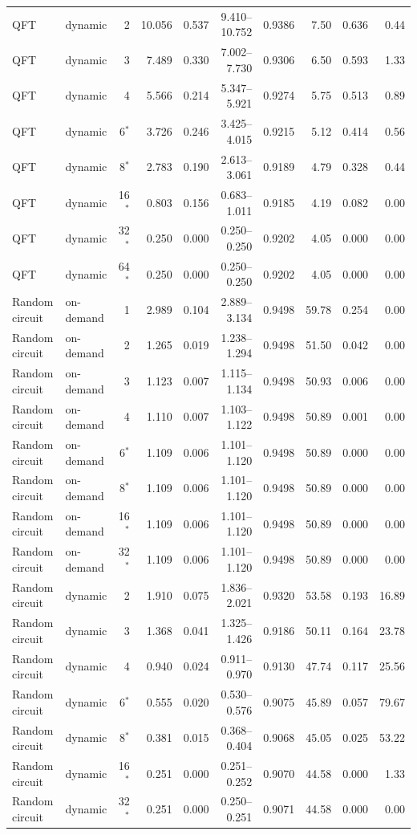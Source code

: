 {\begin{longtable}{@{}llrrrrrrrr@{}}
QFT & dynamic & 2 & 10.056 & 0.537 & 9.410--10.752 & 0.9386 & 7.50 & 0.636 & 0.44 \\
QFT & dynamic & 3 & 7.489 & 0.330 & 7.002--7.730 & 0.9306 & 6.50 & 0.593 & 1.33 \\
QFT & dynamic & 4 & 5.566 & 0.214 & 5.347--5.921 & 0.9274 & 5.75 & 0.513 & 0.89 \\
QFT & dynamic & 6$^*$ & 3.726 & 0.246 & 3.425--4.015 & 0.9215 & 5.12 & 0.414 & 0.56 \\
QFT & dynamic & 8$^*$ & 2.783 & 0.190 & 2.613--3.061 & 0.9189 & 4.79 & 0.328 & 0.44 \\
QFT & dynamic & 16$^*$ & 0.803 & 0.156 & 0.683--1.011 & 0.9185 & 4.19 & 0.082 & 0.00 \\
QFT & dynamic & 32$^*$ & 0.250 & 0.000 & 0.250--0.250 & 0.9202 & 4.05 & 0.000 & 0.00 \\
QFT & dynamic & 64$^*$ & 0.250 & 0.000 & 0.250--0.250 & 0.9202 & 4.05 & 0.000 & 0.00 \\
Random circuit & on-demand & 1 & 2.989 & 0.104 & 2.889--3.134 & 0.9498 & 59.78 & 0.254 & 0.00 \\
Random circuit & on-demand & 2 & 1.265 & 0.019 & 1.238--1.294 & 0.9498 & 51.50 & 0.042 & 0.00 \\
Random circuit & on-demand & 3 & 1.123 & 0.007 & 1.115--1.134 & 0.9498 & 50.93 & 0.006 & 0.00 \\
Random circuit & on-demand & 4 & 1.110 & 0.007 & 1.103--1.122 & 0.9498 & 50.89 & 0.001 & 0.00 \\
Random circuit & on-demand & 6$^*$ & 1.109 & 0.006 & 1.101--1.120 & 0.9498 & 50.89 & 0.000 & 0.00 \\
Random circuit & on-demand & 8$^*$ & 1.109 & 0.006 & 1.101--1.120 & 0.9498 & 50.89 & 0.000 & 0.00 \\
Random circuit & on-demand & 16$^*$ & 1.109 & 0.006 & 1.101--1.120 & 0.9498 & 50.89 & 0.000 & 0.00 \\
Random circuit & on-demand & 32$^*$ & 1.109 & 0.006 & 1.101--1.120 & 0.9498 & 50.89 & 0.000 & 0.00 \\
Random circuit & dynamic & 2 & 1.910 & 0.075 & 1.836--2.021 & 0.9320 & 53.58 & 0.193 & 16.89 \\
Random circuit & dynamic & 3 & 1.368 & 0.041 & 1.325--1.426 & 0.9186 & 50.11 & 0.164 & 23.78 \\
Random circuit & dynamic & 4 & 0.940 & 0.024 & 0.911--0.970 & 0.9130 & 47.74 & 0.117 & 25.56 \\
Random circuit & dynamic & 6$^*$ & 0.555 & 0.020 & 0.530--0.576 & 0.9075 & 45.89 & 0.057 & 79.67 \\
Random circuit & dynamic & 8$^*$ & 0.381 & 0.015 & 0.368--0.404 & 0.9068 & 45.05 & 0.025 & 53.22 \\
Random circuit & dynamic & 16$^*$ & 0.251 & 0.000 & 0.251--0.252 & 0.9070 & 44.58 & 0.000 & 1.33 \\
Random circuit & dynamic & 32$^*$ & 0.251 & 0.000 & 0.250--0.251 & 0.9071 & 44.58 & 0.000 & 0.00 \\
\end{longtable}}
